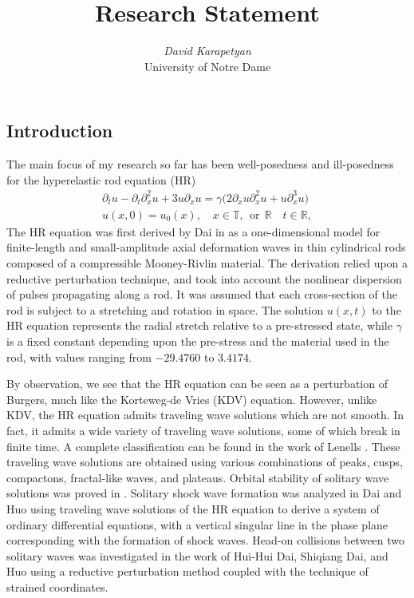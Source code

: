 \documentclass[12pt,reqno]{amsart}
\newcommand{\rr}{\mathbb{R}}
\newcommand{\ci}{\mathbb{T}}
\newcommand{\p}{\partial}
\begin{document}
\title{Research Statement} 
\author{{\it David Karapetyan}\\
    \/ University of Notre Dame}
\maketitle


\parindent0in
\parskip0.1in
%
%
%
\setcounter{section}{0}
%
%
%
%
%
%
%
%
\subsection{Introduction} 
\label{ssec:cur-res}
The main focus of my research so far has been well-posedness and ill-posedness
for the hyperelastic rod equation (HR)
\begin{gather}
\label{hr}
\p_t u
-
\p_t \p_x^2 u
+
3u\p_x u
=
\gamma \big (
2\p_x u \p_x^2 u
+
u \p_x^3 u
\big )
\\
\label{hr-data} u(x, 0) = u_0 (x),
\quad x  \in \ci, \ \ \text{or} \ \ \rr \quad t \in \rr,
\end{gather}
The HR equation was first derived by Dai in \cite{Dai_1998_Model-equations} as a
one-dimensional model for finite-length and small-amplitude axial deformation
waves in thin cylindrical rods composed of a compressible Mooney-Rivlin
material. The derivation relied upon a reductive perturbation technique, and
took into account the nonlinear dispersion of pulses propagating along a rod. It
was assumed that each cross-section of the rod is subject to a stretching and
rotation in space. The solution $u(x,t)$ to the HR equation represents the
radial stretch relative to a pre-stressed state, while $\gamma$ is a fixed
constant depending upon the pre-stress and the material used in the rod, with
values ranging from $- 29.4760$ to $3.4174$.

By observation, we see that the HR equation can be seen as a perturbation of
Burgers, much like the Korteweg-de Vries (KDV) equation.  However, unlike KDV,
the HR equation admits traveling wave solutions which are not smooth. In fact,
it admits a wide variety of traveling wave solutions, some of which break in
finite time. A complete classification can be found in the work of Lenells
\cite{Lenells_2006_Traveling-waves}.  These traveling wave solutions are
obtained using various combinations of peaks, cusps, compactons, fractal-like
waves, and plateaus. Orbital stability of solitary wave solutions was proved in
\cite{Constantin_2000_Stability-of-a-}.  Solitary shock wave formation was
analyzed in Dai and Huo \cite{Dai_2000_Solitary-shock-} using traveling wave
solutions of the HR equation to derive a system of ordinary differential
equations, with a vertical singular line in the phase plane corresponding with
the formation of shock waves. Head-on collisions between two solitary waves was
investigated in the work of Hui-Hui Dai, Shiqiang Dai, and Huo
\cite{Dai_2000_Head-on-collisi} using a reductive perturbation method coupled
with the technique of strained coordinates. 
\end{document}
